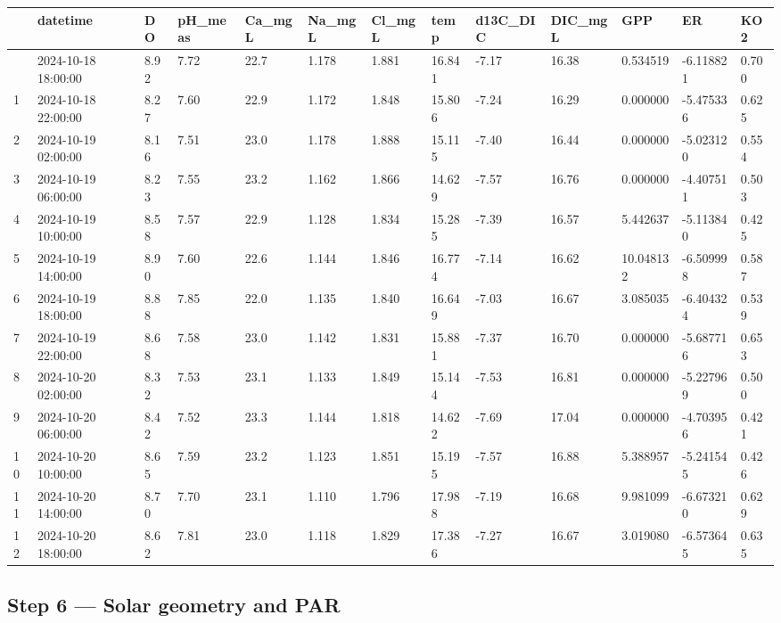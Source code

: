 \documentclass[
  letterpaper,
  DIV=11,
  numbers=noendperiod]{scrartcl}
\newcounter{none} %
\begin{document}
{\def\LTcaptype{none} %
\begin{longtable}[]{@{}lllllllllllll@{}}
\toprule\noalign{}
& datetime & DO & pH\_meas & Ca\_mgL & Na\_mgL & Cl\_mgL & temp &
d13C\_DIC & DIC\_mgL & GPP & ER & KO2 \\
\midrule\noalign{}
\endhead
\bottomrule\noalign{}
\endlastfoot
0 & 2024-10-18 18:00:00 & 8.92 & 7.72 & 22.7 & 1.178 & 1.881 & 16.841 &
-7.17 & 16.38 & 0.534519 & -6.118821 & 0.700 \\
1 & 2024-10-18 22:00:00 & 8.27 & 7.60 & 22.9 & 1.172 & 1.848 & 15.806 &
-7.24 & 16.29 & 0.000000 & -5.475336 & 0.625 \\
2 & 2024-10-19 02:00:00 & 8.16 & 7.51 & 23.0 & 1.178 & 1.888 & 15.115 &
-7.40 & 16.44 & 0.000000 & -5.023120 & 0.554 \\
3 & 2024-10-19 06:00:00 & 8.23 & 7.55 & 23.2 & 1.162 & 1.866 & 14.629 &
-7.57 & 16.76 & 0.000000 & -4.407511 & 0.503 \\
4 & 2024-10-19 10:00:00 & 8.58 & 7.57 & 22.9 & 1.128 & 1.834 & 15.285 &
-7.39 & 16.57 & 5.442637 & -5.113840 & 0.425 \\
5 & 2024-10-19 14:00:00 & 8.90 & 7.60 & 22.6 & 1.144 & 1.846 & 16.774 &
-7.14 & 16.62 & 10.048132 & -6.509998 & 0.587 \\
6 & 2024-10-19 18:00:00 & 8.88 & 7.85 & 22.0 & 1.135 & 1.840 & 16.649 &
-7.03 & 16.67 & 3.085035 & -6.404324 & 0.539 \\
7 & 2024-10-19 22:00:00 & 8.68 & 7.58 & 23.0 & 1.142 & 1.831 & 15.881 &
-7.37 & 16.70 & 0.000000 & -5.687716 & 0.653 \\
8 & 2024-10-20 02:00:00 & 8.32 & 7.53 & 23.1 & 1.133 & 1.849 & 15.144 &
-7.53 & 16.81 & 0.000000 & -5.227969 & 0.500 \\
9 & 2024-10-20 06:00:00 & 8.42 & 7.52 & 23.3 & 1.144 & 1.818 & 14.622 &
-7.69 & 17.04 & 0.000000 & -4.703956 & 0.421 \\
10 & 2024-10-20 10:00:00 & 8.65 & 7.59 & 23.2 & 1.123 & 1.851 & 15.195 &
-7.57 & 16.88 & 5.388957 & -5.241545 & 0.426 \\
11 & 2024-10-20 14:00:00 & 8.70 & 7.70 & 23.1 & 1.110 & 1.796 & 17.988 &
-7.19 & 16.68 & 9.981099 & -6.673210 & 0.629 \\
12 & 2024-10-20 18:00:00 & 8.62 & 7.81 & 23.0 & 1.118 & 1.829 & 17.386 &
-7.27 & 16.67 & 3.019080 & -6.573645 & 0.635 \\
\end{longtable}
}

\subsection{Step 6 --- Solar geometry and
PAR}\label{step-6-solar-geometry-and-par}
\end{document}
